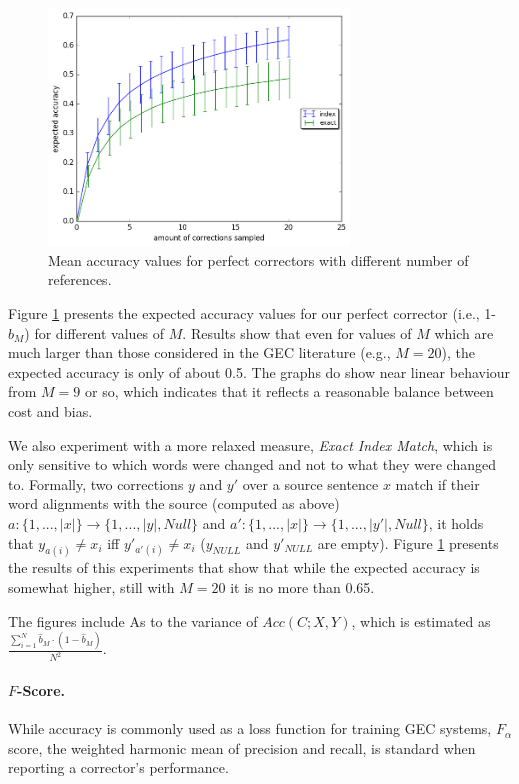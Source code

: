 \documentclass[letter,11pt]{article}
\begin{document}
		\begin{figure}
			\includegraphics[width=8cm]{repeat_1000_accuracy}
			\caption{Mean accuracy values for perfect correctors with different number of references.} \label{fig:accuracy_vals}
		\end{figure}
		
		Figure \ref{fig:accuracy_vals} presents the expected accuracy values for our perfect
                corrector (i.e., 1-$\hat{b}_M$) for different values of $M$. 
                Results show that even for values of $M$ which are much larger than
		those considered in the GEC literature (e.g., $M=20$), the expected accuracy is only of about 0.5.
                The graphs do show near linear behaviour from $M=9$ or
		so, which indicates that it reflects a reasonable balance between cost and bias.
		
		We also experiment with a more relaxed measure, {\it Exact Index Match}, which is only sensitive
                to which words were changed and not to what they were changed to.
                Formally, two corrections $y$ and $y'$ over a source sentence $x$ match
                if their word alignments with the source (computed as above) $a:\{1,...,|x|\} \rightarrow \{1,...,|y|,Null\}$
                and $a':\{1,...,|x|\} \rightarrow \{1,...,|y'|,Null\}$, it holds that 
                $y_{a(i)} \neq x_{i}$ iff $y'_{a'(i)} \neq x_{i}$ ($y_{NULL}$ and $y'_{NULL}$ are empty).
                Figure \ref{fig:accuracy_vals} presents the results of this experiments that
                show that while the expected accuracy is somewhat higher, still with $M=20$ it is no more than 0.65.

                The figures include As to the variance of $Acc(C;X,Y)$, which is estimated
                as $\frac{\sum_{i=1}^{N} \hat{b}_M\cdot\left(1-\hat{b}_M\right)}{N^2}$.
                
		\paragraph{$F$-Score.}
		While accuracy is commonly used as a loss function for training GEC systems,
		$F_\alpha$ score, the weighted harmonic mean of precision and recall,
                is standard when reporting a corrector's performance.
		
\end{document}
